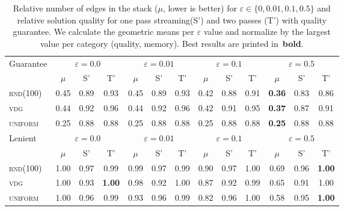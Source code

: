 
    
    
\begin{table*}[t]
  \caption{Relative number of edges in the stack ($\mu$, lower is better) for $\varepsilon\in\{0,0.01,0.1,0.5\}$ and relative solution quality for one pass streaming(\textsf{S'}) and two passes (\textsf{T'}) with quality guarantee. We calculate the geometric means per $\varepsilon$ value and normalize by the largest value per category (quality, memory). Best results are printed in~\textbf{bold}.  }
\label{tab:memory}
  \centering
  {\footnotesize
\begin{tabular}{lcccccccccccc}
  \toprule
    \multirow{2}{*}{\textsf{Guarantee}}
  & \multicolumn{3}{c}{$\varepsilon=0.0$}& \multicolumn{3}{c}{$\varepsilon=0.01$}& \multicolumn{3}{c}{$\varepsilon=0.1$}& \multicolumn{3}{c}{$\varepsilon=0.5$}\\
  \cmidrule(lr){2-4}\cmidrule(lr){5-7}\cmidrule(lr){8-10}\cmidrule(lr){11-13}
&$\mu$&\textsf{S'}&\textsf{T'}&$\mu$&\textsf{S'}&\textsf{T'}&$\mu$&\textsf{S'}&\textsf{T'}&$\mu$&\textsf{S'}&\textsf{T'}\\\midrule
 \textsc{rnd(100)}&0.45&0.89& 0.93&0.45&0.89&0.93&0.42&0.88&0.91& \bfseries 0.36&0.83&0.86\\
 \textsc{vdg}&0.44&0.92&0.96& 0.44&0.92&0.96&0.42&0.91&0.95& \bfseries 0.37&0.87&0.91\\
 \textsc{uniform} &0.25&0.88&  0.88&0.25 &0.88&0.88&0.25&0.88&0.88& \bfseries 0.25&0.88&0.88\\
\midrule
\multirow{2}{*}{\textsf{Lenient}}
& \multicolumn{3}{c}{$\varepsilon=0.0$}& \multicolumn{3}{c}{$\varepsilon=0.01$}& \multicolumn{3}{c}{$\varepsilon=0.1$}& \multicolumn{3}{c}{$\varepsilon=0.5$}\\
\cmidrule(lr){2-4}\cmidrule(lr){5-7}\cmidrule(lr){8-10}\cmidrule(lr){11-13}
&$\mu$&\textsf{S'}&\textsf{T'}&$\mu$&\textsf{S'}&\textsf{T'}&$\mu$&\textsf{S'}&\textsf{T'}&$\mu$&\textsf{S'}&\textsf{T'}\\\midrule
\textsc{rnd(100)}&1.00&0.97&  0.99&0.99&0.97&0.99&0.90&0.97&1.00&  0.69&0.96&\bfseries 1.00\\
\textsc{vdg}&1.00&0.93&\bfseries 1.00& 0.98&0.92&1.00&0.87&0.92&0.99&  0.65&0.91&1.00\\
\textsc{uniform} &1.00&0.96&  0.99&0.93&0.96&0.99&0.82&0.96&1.00& 0.58&0.95&\bfseries 1.00\\
\bottomrule
\end{tabular}
  }

\end{table*}
